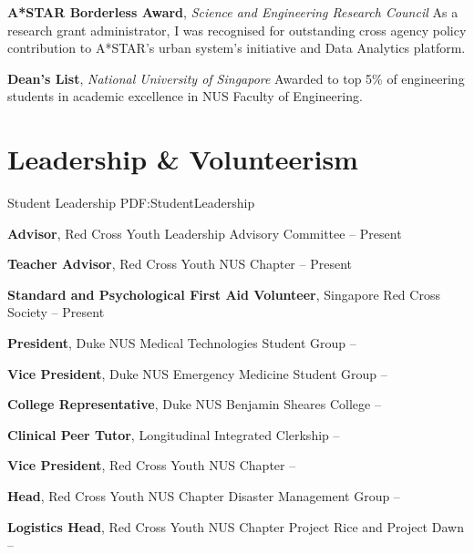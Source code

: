 \documentclass[letterpaper,10pt,oneside]{article}
\begin{document}
\begin{body}
\textbf{A*STAR Borderless Award}, \textit{Science and Engineering Research Council}
\hfill
{}
\BulletItem
As a research grant administrator, I was recognised for outstanding cross agency policy contribution to A*STAR's urban system's initiative and Data Analytics platform.
\GapNoBreak
\medskip

\textbf{Dean's List}, \textit{National University of Singapore}
\hfill
{}
\BulletItem
Awarded to top 5\% of engineering students in academic excellence in NUS Faculty of Engineering.
\GapNoBreak






\section
{Leadership \& Volunteerism}
{Student Leadership}
{PDF:StudentLeadership}

\textbf{Advisor}, Red Cross Youth Leadership Advisory Committee
\hfill
{} -- Present
\GapNoBreak

\textbf{Teacher Advisor}, Red Cross Youth NUS Chapter
\hfill
{} -- Present
\GapNoBreak

\textbf{Standard and Psychological First Aid Volunteer}, Singapore Red Cross Society
\hfill
{} -- Present
\GapNoBreak

\textbf{President}, Duke NUS Medical Technologies Student Group
\hfill
{} --  
\GapNoBreak

\textbf{Vice President}, Duke NUS Emergency Medicine Student Group
\hfill
{} --  
\GapNoBreak

\textbf{College Representative}, Duke NUS Benjamin Sheares College
\hfill
{} --  
\GapNoBreak

\textbf{Clinical Peer Tutor}, Longitudinal Integrated Clerkship
\hfill
{} --  
\GapNoBreak

\textbf{Vice President}, Red Cross Youth NUS Chapter
\hfill
{} --  
\GapNoBreak

\textbf{Head}, Red Cross Youth NUS Chapter Disaster Management Group
\hfill
{} --  
\GapNoBreak

\textbf{Logistics Head}, Red Cross Youth NUS Chapter Project Rice and Project Dawn
\hfill
{} --  
\GapNoBreak


\end{body}
\end{document}
